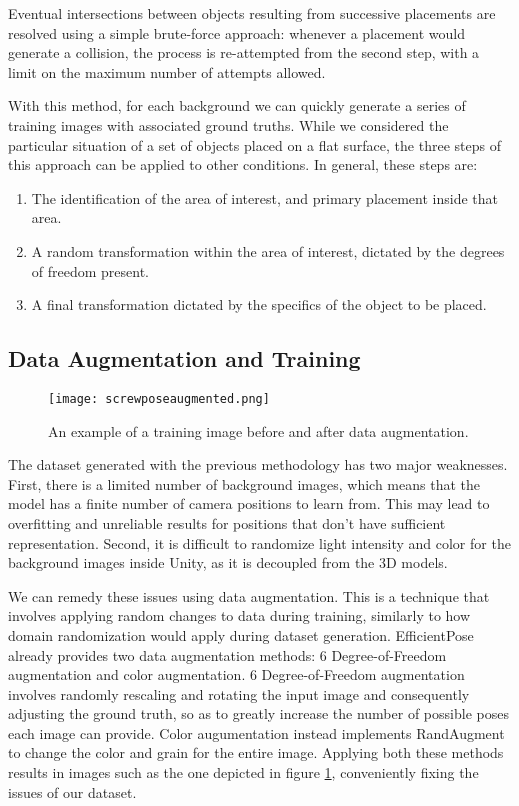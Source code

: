 Eventual intersections between objects resulting from successive placements are resolved using a simple brute-force approach: whenever a placement would generate a collision, the process is re-attempted from the second step, with a limit on the maximum number of attempts allowed.

With this method, for each background we can quickly generate a series of training images with associated ground truths. While we considered the particular situation of a set of objects placed on a flat surface, the three steps of this approach can be applied to other conditions. In general, these steps are:

\begin{enumerate}
    \item The identification of the area of interest, and primary placement inside that area.
    \item A random transformation within the area of interest, dictated by the degrees of freedom present.
    \item A final transformation dictated by the specifics of the object to be placed.
\end{enumerate}

\subsection{Data Augmentation and Training}

\begin{figure}[ht]
    \texttt{[image: screwposeaugmented.png]}
    \caption{An example of a training image before and after data augmentation.}
    \label{fig:ScrewPoseAugmented}
\end{figure}

The dataset generated with the previous methodology has two major weaknesses. First, there is a limited number of background images, which means that the model has a finite number of camera positions to learn from. This may lead to overfitting and unreliable results for positions that don't have sufficient representation. Second, it is difficult to randomize light intensity and color for the background images inside Unity, as it is decoupled from the 3D models.

We can remedy these issues using data augmentation. This is a technique that involves applying random changes to data during training, similarly to how domain randomization would apply during dataset generation. EfficientPose already provides two data augmentation methods: 6 Degree-of-Freedom augmentation and color augmentation. 6 Degree-of-Freedom augmentation involves randomly rescaling and rotating the input image and consequently adjusting the ground truth, so as to greatly increase the number of possible poses each image can provide. Color augumentation instead implements RandAugment\cite{RandAugment} to change the color and grain for the entire image. Applying both these methods results in images such as the one depicted in figure \ref{fig:ScrewPoseAugmented}, conveniently fixing the issues of our dataset.

